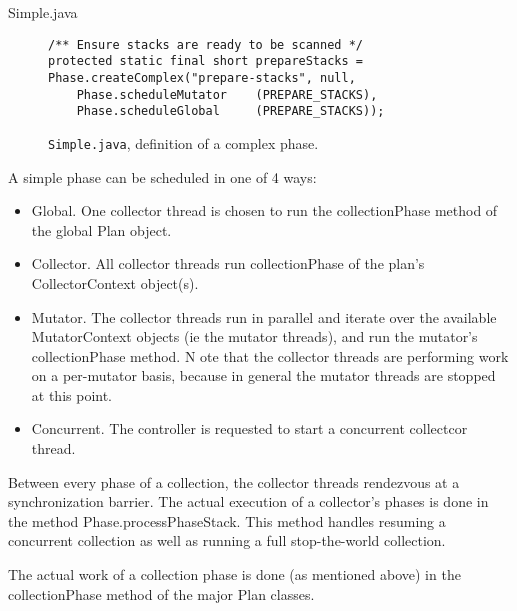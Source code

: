 Simple.java
\begin{figure}[h]
\begin{lstlisting}
/** Ensure stacks are ready to be scanned */
protected static final short prepareStacks = Phase.createComplex("prepare-stacks", null,
    Phase.scheduleMutator    (PREPARE_STACKS),
    Phase.scheduleGlobal     (PREPARE_STACKS));
\end{lstlisting}
\caption{\lstinline|Simple.java|, definition of a complex phase.}
\label{fig:gc:complexphase}
\end{figure}
A simple phase can be scheduled in one of 4 ways: 
\begin{itemize}
\item Global.  One collector thread is chosen to run the collectionPhase method
of the global Plan object.
\item Collector.  All collector threads run collectionPhase of the plan's
CollectorContext object(s).
\item Mutator.  The collector threads run in parallel and iterate over the
available MutatorContext objects (ie the mutator threads), 
and run the mutator's collectionPhase method.  N
ote that the collector threads are performing work on a per-mutator basis, 
because in general the mutator threads are stopped at this point.
\item Concurrent.  The controller is requested to start a concurrent collectcor
thread.
\end{itemize}
Between every phase of a collection, the collector threads rendezvous at a synchronization barrier.  The actual execution of a collector's phases is done in the method Phase.processPhaseStack.  This method handles resuming a concurrent collection as well as running a full stop-the-world collection.

The actual work of a collection phase is done (as mentioned above) in the collectionPhase method of the major Plan classes.

